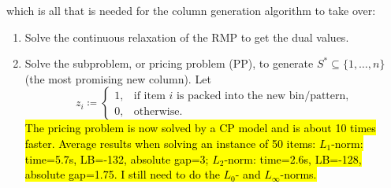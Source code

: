 \documentclass{llncs}
\begin{document}
\noindent which is all that is needed for the column generation algorithm to take over:

\begin{enumerate}
\item Solve the continuous relaxation of the RMP to get the dual values.
\item Solve the subproblem, or pricing problem (PP), to generate $S^{*} \subseteq \{1, \dots, n\}$ (the most promising new column). Let
\begin{equation}
  z_{i}\coloneqq
  \begin{cases}
    1, & \mbox{if item $i$ is packed into the new bin/pattern,} \\
    0, & \mbox{otherwise.}
  \end{cases}
\end{equation}
\hl{The pricing problem is now solved by a CP model and is about 10 times faster. Average results when solving an instance of 50 items: $L_1$-norm: time=5.7s, LB=-132, absolute gap=3; $L_2$-norm: time=2.6s, LB=-128, absolute gap=1.75. I still need to do the $L_{0}$- and $L_{\infty}$-norms.}


\end{enumerate}
\end{document}
